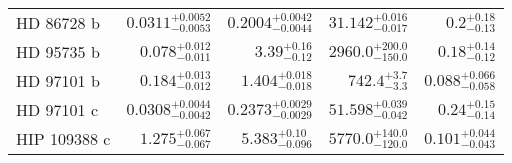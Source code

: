 \begin{longtable*}{lrrrr}
HD 86728 b & $0.0311^{+0.0052}_{-0.0053}$ & $0.2004^{+0.0042}_{-0.0044}$ & $31.142^{+0.016}_{-0.017}$ & $0.2^{+0.18}_{-0.13}$ \\ 
HD 95735 b & $0.078^{+0.012}_{-0.011}$ & $3.39^{+0.16}_{-0.12}$ & $2960.0^{+200.0}_{-150.0}$ & $0.18^{+0.14}_{-0.12}$ \\ 
HD 97101 b & $0.184^{+0.013}_{-0.012}$ & $1.404^{+0.018}_{-0.018}$ & $742.4^{+3.7}_{-3.3}$ & $0.088^{+0.066}_{-0.058}$ \\ 
HD 97101 c & $0.0308^{+0.0044}_{-0.0042}$ & $0.2373^{+0.0029}_{-0.0029}$ & $51.598^{+0.039}_{-0.042}$ & $0.24^{+0.15}_{-0.14}$ \\ 
HIP 109388 c & $1.275^{+0.067}_{-0.067}$ & $5.383^{+0.10}_{-0.096}$ & $5770.0^{+140.0}_{-120.0}$ & $0.101^{+0.044}_{-0.043}$ \\ 
\bottomrule 
\end{longtable*} 
